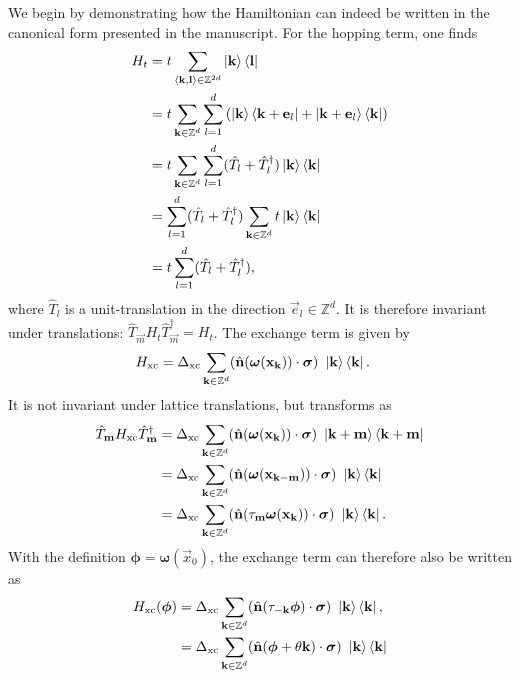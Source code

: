 \documentclass[
    aps,
    prb,
    twocolumn,
    floatfix,
    superscriptaddress,
	10pt
]{revtex4-2}
\begin{document}
We begin by demonstrating how the Hamiltonian can indeed be written in the canonical form presented in the manuscript.
For the hopping term, one finds
\begin{align}
H_t &= t \sum_{\braket{\mathbf{k},\mathbf{l}} \in \mathbb{Z}^{2d}}\ket{\mathbf{k}}\bra{\mathbf{l}}
\notag \\
&= 
	t \sum_{\mathbf{k} \in \mathbb{Z}^{d}}  \sum_{l=1}^d
	\left( \ket{\mathbf{k}}\bra{\mathbf{k}+\mathbf{e}_l } + \ket{\mathbf{k}+\mathbf{e}_l}\bra{\mathbf{k} } \right)
\notag \\
&= 
	t \sum_{\mathbf{k} \in \mathbb{Z}^{d}} \sum_{l=1}^d
	(\hat{T}_l + \hat{T}_l^\dagger)\ket{\mathbf{k}}\bra{\mathbf{k} } 
\notag \\
&= 
 \sum_{l=1}^d
(\hat{T}_l+ \hat{T}_l^\dagger) \sum_{\mathbf{k} \in \mathbb{Z}^{d}} t \ket{\mathbf{k}}\bra{\mathbf{k} } 
\notag \\
&= t
\sum_{l=1}^d
(\hat{T}_l + \hat{T}_l^\dagger)  ,
\end{align}
where $\hat{T}_l$ is a unit-translation in the direction $\vec{e}_l \in \mathbb{Z}^d$.
It is therefore invariant under translations:  $\hat{T}_\vec{m} 
H_t
\hat{T}_\vec{m}^\dagger = H_t$. 
The exchange term is given by
\begin{align}
	H_\mathrm{xc} &=
	\Delta_\mathrm{xc}\sum_{\mathbf{k} \in \mathbb{Z}^d}  (\hat{\mathbf{n}} (\boldsymbol{\omega}(\mathbf{x}_{\mathbf{k}})) \cdot \boldsymbol{\sigma}) ~ \ket{\mathbf{k}}\bra{\mathbf{k}} .
\end{align}
It is not invariant under lattice translations, but transforms as
\begin{align}
	\hat{T}_{\mathbf{m}}
	H_\mathrm{xc}
	\hat{T}_{\mathbf{m}}^\dagger
	& = \Delta_\mathrm{xc}\sum_{\mathbf{k} \in \mathbb{Z}^d}  (\hat{\mathbf{n}} (\boldsymbol{\omega}(\mathbf{x}_{\mathbf{k}})) \cdot \boldsymbol{\sigma}) ~ \ket{\mathbf{k}+\mathbf{m}}\bra{\mathbf{k}+\mathbf{m}}
		\notag \\
	& = \Delta_\mathrm{xc}\sum_{\mathbf{k} \in \mathbb{Z}^d}  (\hat{\mathbf{n}} (\boldsymbol{\omega}(\mathbf{x}_{\mathbf{k}-\mathbf{m}})) \cdot \boldsymbol{\sigma}) ~ \ket{\mathbf{k}}\bra{\mathbf{k}}
	\notag \\
	& = \Delta_\mathrm{xc}\sum_{\mathbf{k} \in \mathbb{Z}^d}  (\hat{\mathbf{n}} (\tau_{\mathbf{m}} \boldsymbol{\omega}(\mathbf{x}_{\mathbf{k}})) \cdot \boldsymbol{\sigma}) ~ \ket{\mathbf{k}}\bra{\mathbf{k}} . 
\end{align} 
With the definition $\boldsymbol{\phi} = \boldsymbol{\omega}(\vec{x}_0)$, the exchange term can therefore also be written as 
\begin{align}
	H_\mathrm{xc}( \boldsymbol{\phi} ) &=
	\Delta_\mathrm{xc}\sum_{\mathbf{k} \in \mathbb{Z}^d}  (\hat{\mathbf{n}} ( \tau_{\mathbf{-k}}\boldsymbol{\phi}) \cdot \boldsymbol{\sigma}) ~ \ket{\mathbf{k}}\bra{\mathbf{k}} ,
	\notag \\ & =
	\Delta_\mathrm{xc}\sum_{\mathbf{k} \in \mathbb{Z}^d}  (\hat{\mathbf{n}} (\boldsymbol{\phi} + \theta \mathbf{k}) \cdot \boldsymbol{\sigma}) ~ \ket{\mathbf{k}}\bra{\mathbf{k}} 
\end{align}
\end{document}
